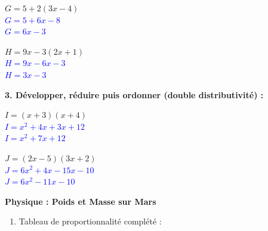 \documentclass[a4paper]{book}
\begin{document}
{\begin{exercice}
        \medskip
        
        \noindent
        \begin{minipage}{0.48\textwidth}
            $G = 5 + 2(3x - 4)$\\
            \textcolor{blue}{$G = 5 + 6x - 8$}\\
            \textcolor{blue}{$G = 6x - 3$}
            \vspace{0.5cm}
        \end{minipage}\hfill
        \begin{minipage}{0.48\textwidth}
            $H = 9x - 3(2x + 1)$\\
            \textcolor{blue}{$H = 9x - 6x - 3$}\\
            \textcolor{blue}{$H = 3x - 3$}
            \vspace{0.5cm}
        \end{minipage}
    
        \medskip
        \textbf{3. Développer, réduire puis ordonner (double distributivité) :}
        
        \noindent
        \begin{minipage}{0.48\textwidth}
            $I = (x + 3)(x + 4)$\\
            \textcolor{blue}{$I = x^2 + 4x + 3x + 12$}\\
            \textcolor{blue}{$I = x^2 + 7x + 12$}
            \vspace{0.5cm}
        \end{minipage}\hfill
        \begin{minipage}{0.48\textwidth}
            $J = (2x - 5)(3x + 2)$\\
            \textcolor{blue}{$J = 6x^2 + 4x - 15x - 10$}\\
            \textcolor{blue}{$J = 6x^2 - 11x - 10$}
            \vspace{0.5cm}
        \end{minipage}
    \end{exercice}

    \vspace{0.5cm}
    
    \begin{exercice}
        \textbf{Physique : Poids et Masse sur Mars} 
            
        \begin{enumerate}
            \item Tableau de proportionnalité complété :


\end{enumerate}
\end{exercice}}
\end{document}
